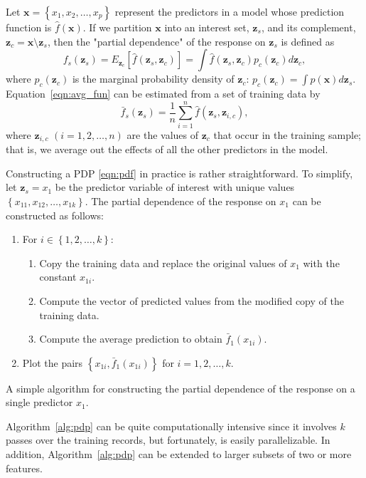 \documentclass[12pt]{article}
\begin{document}
Let $\boldsymbol{x} = \left\{x_1, x_2, \dots, x_p\right\}$ represent the predictors in a model whose prediction function is $\widehat{f}\left(\boldsymbol{x}\right)$. If we partition $\boldsymbol{x}$ into an interest set, $\boldsymbol{z}_s$, and its complement, $\boldsymbol{z}_c = \boldsymbol{x} \setminus \boldsymbol{z}_s$, then the "partial dependence" of the response on $\boldsymbol{z}_s$ is defined as
\begin{equation}
\label{eqn:avg_fun}
  f_s\left(\boldsymbol{z}_s\right) = E_{\boldsymbol{z}_c}\left[\widehat{f}\left(\boldsymbol{z}_s, \boldsymbol{z}_c\right)\right] = \int \widehat{f}\left(\boldsymbol{z}_s, \boldsymbol{z}_c\right)p_{c}\left(\boldsymbol{z}_c\right)d\boldsymbol{z}_c,
\end{equation}
where $p_{c}\left(\boldsymbol{z}_c\right)$ is the marginal probability density of $\boldsymbol{z}_c$: $p_{c}\left(\boldsymbol{z}_c\right) = \int p\left(\boldsymbol{x}\right)d\boldsymbol{z}_s$.
Equation~\eqref{eqn:avg_fun} can be estimated from a set of training data by
\begin{equation}
\label{eqn:pdf}
\bar{f}_s\left(\boldsymbol{z}_s\right) = \frac{1}{n}\sum_{i = 1}^n\widehat{f}\left(\boldsymbol{z}_s,\boldsymbol{z}_{i, c}\right),
\end{equation}
where $\boldsymbol{z}_{i, c}$ $\left(i = 1, 2, \dots, n\right)$ are the values of $\boldsymbol{z}_c$ that occur in the training sample; that is, we average out the effects of all the other predictors in the model.

Constructing a PDP \eqref{eqn:pdf} in practice is rather straightforward. To simplify, let $\boldsymbol{z}_s = x_1$ be the predictor variable of interest with unique values $\left\{x_{11}, x_{12}, \dots, x_{1k}\right\}$. The partial dependence of the response on $x_1$ can be constructed as follows:

\begin{algorithm}
\begin{enumerate}
  \item For $i \in \left\{1, 2, \dots, k\right\}$:
  \begin{enumerate}
    \item Copy the training data and replace the original values of $x_1$ with the constant $x_{1i}$.
    \item Compute the vector of predicted values from the modified copy of the training data.
    \item Compute the average prediction to obtain $\bar{f}_1\left(x_{1i}\right)$.
  \end{enumerate}
  \item Plot the pairs $\left\{x_{1i}, \bar{f}_1\left(x_{1i}\right)\right\}$ for $i = 1, 2, \dotsc, k$.
\end{enumerate}
\caption{A simple algorithm for constructing the partial dependence of the response on a single predictor $x_1$. \label{alg:pdp}}
\end{algorithm}
Algorithm~\eqref{alg:pdp} can be quite computationally intensive since it involves $k$ passes over the training records, but fortunately, is easily parallelizable. In addition, Algorithm~\eqref{alg:pdp} can be extended to larger subsets of two or more features.
\end{document}
